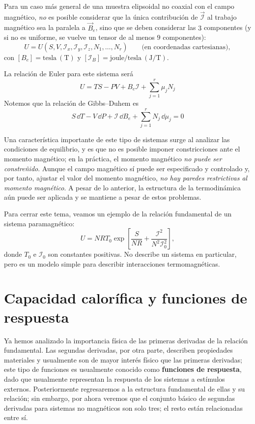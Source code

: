 Para un caso más general de una muestra elipsoidal no coaxial con el campo magnético, \emph{no} es
posible considerar que la única contribución de $\vec{\mathcal{I}}$ al trabajo magnético sea la
paralela a $\vec{B}_e$, sino que se deben considerar las $3$ componentes (y si no es uniforme, se
vuelve un tensor de al menos $9$ componentes):
\begin{equation*}
  U=U(S,V,\mathcal{I}_x,\mathcal{I}_y,\mathcal{I}_z,N_1,\dots,N_r)\qquad\text{(en coordenadas cartesianas)},
\end{equation*}
con $[B_e]=\text{tesla}\ (\mathrm{T})$ y $[\mathcal{I}_B]=\text{joule/tesla}\ (\mathrm{J/T})$.

La relación de Euler para este sistema será
\begin{equation*}
  \boxed{U=TS-PV+B_e\mathcal{I}+\sum_{j=1}^{r}\mu_jN_j}
\end{equation*}
Notemos que la relación de Gibbs--Duhem es
\begin{equation*}
  \boxed{S\,\dd T-V\,\dd P+\mathcal{I}\,\dd B_e+\sum_{j=1}^{r}N_j\,\dd\mu_j=0}
\end{equation*}

Una característica importante de este tipo de sistemas surge al analizar las condiciones de
equilibrio, y es que no es posible imponer constricciones ante el momento magnético; en la práctica,
el momento magnético \emph{no puede ser constreñido}. Aunque el campo magnético sí puede ser
especificado y controlado y, por tanto, ajustar el valor del momento magnético, \emph{no hay paredes
restrictivas al momento magnético}. A pesar de lo anterior, la estructura de la termodinámica aún
puede ser aplicada y se mantiene a pesar de estos problemas.

Para cerrar este tema, veamos un ejemplo de la relación fundamental de un sistema paramagnético:
\begin{equation*}
  U=NRT_0\exp\left[\frac{S}{NR}+\frac{\mathcal{I}^{2}}{N^{2}\mathcal{I}_0^{2}}\right],
\end{equation*}
donde $T_0$ e $\mathcal{I}_0$ son constantes positivas. No describe un sistema en particular, pero es
un modelo simple para describir interacciones termomagnéticas.

\section{Capacidad calorífica y funciones de respuesta}

Ya hemos analizado la importancia física de las primeras derivadas de la relación fundamental. Las
segundas derivadas, por otra parte, describen propiedades materiales y usualmente son de mayor
interés físico que las primeras derivadas; este tipo de funciones es usualmente conocido como
\textbf{funciones de respuesta}, dado que usualmente representan la respuesta de los sistemas a
estímulos externos. Posteriormente regresaremos a la estructura fundamental de ellas y su relación;
sin embargo, por ahora veremos que el conjunto básico de segundas derivadas para sistemas no
magnéticos son solo tres; el resto están relacionadas entre sí.


